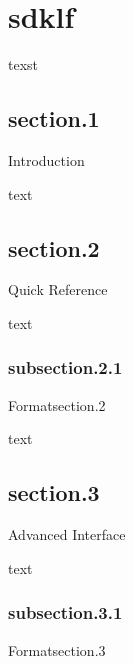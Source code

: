 \documentclass{book}
\begin{document}
\tableofcontents
\chapter{sdklf}
texst\newpage\section   {section.1}{Introduction}{}%

text\newpage\section   {section.2}{Quick Reference}{}%

text\newpage\subsection{subsection.2.1}{Format}{section.2}%

text\newpage\section   {section.3}{Advanced Interface}{}%

text\newpage\subsection{subsection.3.1}{Format}{section.3}%
\end{document}
